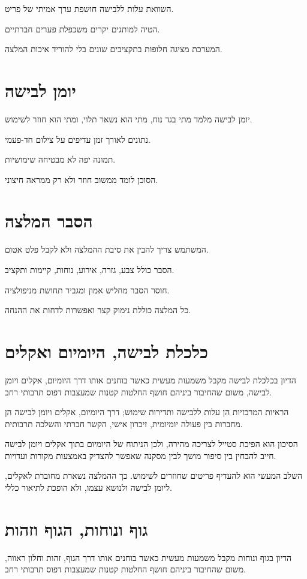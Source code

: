 השוואת עלות ללבישה חושפת ערך אמיתי של פריט.

הטיה למותגים יקרים משכפלת פערים חברתיים.

המערכת מציגה חלופות בתקציבים שונים בלי להוריד איכות המלצה.

\section{יומן לבישה}
יומן לבישה מלמד מתי בגד נוח, מתי הוא נשאר תלוי, ומתי הוא חוזר לשימוש.

נתונים לאורך זמן עדיפים על צילום חד-פעמי.

תמונה יפה לא מבטיחה שימושיות.

הסוכן לומד ממשוב חוזר ולא רק ממראה חיצוני.

\section{הסבר המלצה}
המשתמש צריך להבין את סיבת ההמלצה ולא לקבל פלט אטום.

הסבר כולל צבע, גזרה, אירוע, נוחות, קיימות ותקציב.

חוסר הסבר מחליש אמון ומגביר תחושת מניפולציה.

כל המלצה כוללת נימוק קצר ואפשרות לדחות את ההנחה.

\section{כלכלת לבישה, היומיום ואקלים}
הדיון בכלכלת לבישה מקבל משמעות מעשית כאשר בוחנים אותו דרך היומיום, אקלים ויומן לבישה, משום שהחיבור ביניהם חושף החלטות קטנות שמעצבות דפוס תרבותי רחב.

הראיות המרכזיות הן עלות ללבישה ותדירות שימוש; דרך היומיום, אקלים ויומן לבישה הן מחברות בין פעולה יומיומית, זיכרון אישי, הקשר חברתי והשלכה תרבותית.

הסיכון הוא הפיכת סטייל לצריכה מהירה, ולכן הניתוח של היומיום בתוך אקלים ויומן לבישה חייב להבחין בין סיפור מושך לבין מסקנה שאפשר להצדיק באמצעות מקורות ועדויות.

השלב המעשי הוא להעדיף פריטים שחוזרים לשימוש. כך ההמלצה נשארת מחוברת לאקלים, ליומן לבישה ולנושא עצמו, ולא הופכת לתיאור כללי.

\section{גוף ונוחות, הגוף וזהות}
הדיון בגוף ונוחות מקבל משמעות מעשית כאשר בוחנים אותו דרך הגוף, זהות וחלון ראווה, משום שהחיבור ביניהם חושף החלטות קטנות שמעצבות דפוס תרבותי רחב.

